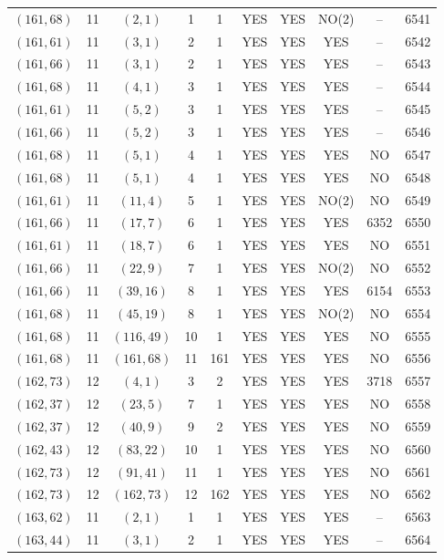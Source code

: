 \begin{longtable}{|c|c|c|c|c|c|c|c|c|c|}
$(161, 68)$ & 11 & $(2, 1)$ & 1 & 1 & YES & YES & NO(2) & -- & 6541\\
$(161, 61)$ & 11 & $(3, 1)$ & 2 & 1 & YES & YES & YES & -- & 6542\\
$(161, 66)$ & 11 & $(3, 1)$ & 2 & 1 & YES & YES & YES & -- & 6543\\
$(161, 68)$ & 11 & $(4, 1)$ & 3 & 1 & YES & YES & YES & -- & 6544\\
$(161, 61)$ & 11 & $(5, 2)$ & 3 & 1 & YES & YES & YES & -- & 6545\\
$(161, 66)$ & 11 & $(5, 2)$ & 3 & 1 & YES & YES & YES & -- & 6546\\
$(161, 68)$ & 11 & $(5, 1)$ & 4 & 1 & YES & YES & YES & NO & 6547\\
$(161, 68)$ & 11 & $(5, 1)$ & 4 & 1 & YES & YES & YES & NO & 6548\\
$(161, 61)$ & 11 & $(11, 4)$ & 5 & 1 & YES & YES & NO(2) & NO & 6549\\
$(161, 66)$ & 11 & $(17, 7)$ & 6 & 1 & YES & YES & YES & 6352 & 6550\\
$(161, 61)$ & 11 & $(18, 7)$ & 6 & 1 & YES & YES & YES & NO & 6551\\
$(161, 66)$ & 11 & $(22, 9)$ & 7 & 1 & YES & YES & NO(2) & NO & 6552\\
$(161, 66)$ & 11 & $(39, 16)$ & 8 & 1 & YES & YES & YES & 6154 & 6553\\
$(161, 68)$ & 11 & $(45, 19)$ & 8 & 1 & YES & YES & NO(2) & NO & 6554\\
$(161, 68)$ & 11 & $(116, 49)$ & 10 & 1 & YES & YES & YES & NO & 6555\\
$(161, 68)$ & 11 & $(161, 68)$ & 11 & 161 & YES & YES & YES & NO & 6556\\
$(162, 73)$ & 12 & $(4, 1)$ & 3 & 2 & YES & YES & YES & 3718 & 6557\\
$(162, 37)$ & 12 & $(23, 5)$ & 7 & 1 & YES & YES & YES & NO & 6558\\
$(162, 37)$ & 12 & $(40, 9)$ & 9 & 2 & YES & YES & YES & NO & 6559\\
$(162, 43)$ & 12 & $(83, 22)$ & 10 & 1 & YES & YES & YES & NO & 6560\\
$(162, 73)$ & 12 & $(91, 41)$ & 11 & 1 & YES & YES & YES & NO & 6561\\
$(162, 73)$ & 12 & $(162, 73)$ & 12 & 162 & YES & YES & YES & NO & 6562\\
$(163, 62)$ & 11 & $(2, 1)$ & 1 & 1 & YES & YES & YES & -- & 6563\\
$(163, 44)$ & 11 & $(3, 1)$ & 2 & 1 & YES & YES & YES & -- & 6564\\

\end{longtable}

